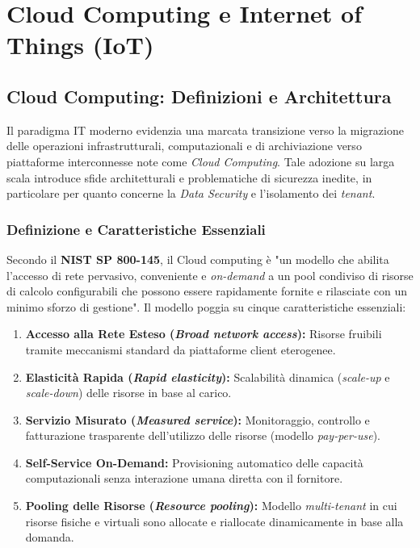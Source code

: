 \chapter{Cloud Computing e Internet of Things (IoT)}

\section{Cloud Computing: Definizioni e Architettura}
Il paradigma IT moderno evidenzia una marcata transizione verso la migrazione delle operazioni infrastrutturali, computazionali e di archiviazione verso piattaforme interconnesse note come \textit{Cloud Computing}. Tale adozione su larga scala introduce sfide architetturali e problematiche di sicurezza inedite, in particolare per quanto concerne la \textit{Data Security} e l'isolamento dei \textit{tenant}.

\subsection{Definizione e Caratteristiche Essenziali}
Secondo il \textbf{NIST SP 800-145}, il Cloud computing è "un modello che abilita l'accesso di rete pervasivo, conveniente e \textit{on-demand} a un pool condiviso di risorse di calcolo configurabili che possono essere rapidamente fornite e rilasciate con un minimo sforzo di gestione". 
Il modello poggia su cinque caratteristiche essenziali:
\begin{enumerate}
    \item \textbf{Accesso alla Rete Esteso (\textit{Broad network access}):} Risorse fruibili tramite meccanismi standard da piattaforme client eterogenee.
    \item \textbf{Elasticità Rapida (\textit{Rapid elasticity}):} Scalabilità dinamica (\textit{scale-up} e \textit{scale-down}) delle risorse in base al carico.
    \item \textbf{Servizio Misurato (\textit{Measured service}):} Monitoraggio, controllo e fatturazione trasparente dell'utilizzo delle risorse (modello \textit{pay-per-use}).
    \item \textbf{Self-Service On-Demand:} Provisioning automatico delle capacità computazionali senza interazione umana diretta con il fornitore.
    \item \textbf{Pooling delle Risorse (\textit{Resource pooling}):} Modello \textit{multi-tenant} in cui risorse fisiche e virtuali sono allocate e riallocate dinamicamente in base alla domanda.
\end{enumerate}

